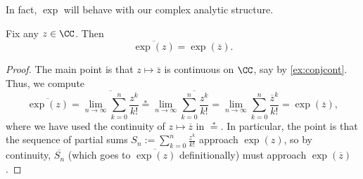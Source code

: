 In fact, $\exp$ will behave with our complex analytic structure.
\begin{lemma} \label{lem:expconj}
	Fix any $z\in\CC$. Then
	\[\overline{\exp(z)}=\exp(\overline z).\]
\end{lemma}
\begin{proof}
	The main point is that $z\mapsto\overline z$ is continuous on $\CC$, say by \autoref{ex:conjcont}. Thus, we compute
	\[\overline{\exp(z)}=\overline{\lim_{n\to\infty}\sum_{k=0}^n\frac{z^k}{k!}}\stackrel*=\lim_{n\to\infty}\overline{\sum_{k=0}^n\frac{z^k}{k!}}=\lim_{n\to\infty}\sum_{k=0}^n\frac{\overline z^k}{k!}=\exp(\overline z),\]
	where we have used the continuity of $z\mapsto\overline z$ in $\stackrel*=$. In particular, the point is that the sequence of partial sums $S_n:=\sum_{k=0}^n\frac{z^k}{k!}$ approach $\exp(z)$, so by continuity, $\overline{S_n}$ (which goes to $\overline{\exp(z)}$ definitionally) must approach $\exp(\overline z)$.
\end{proof}

